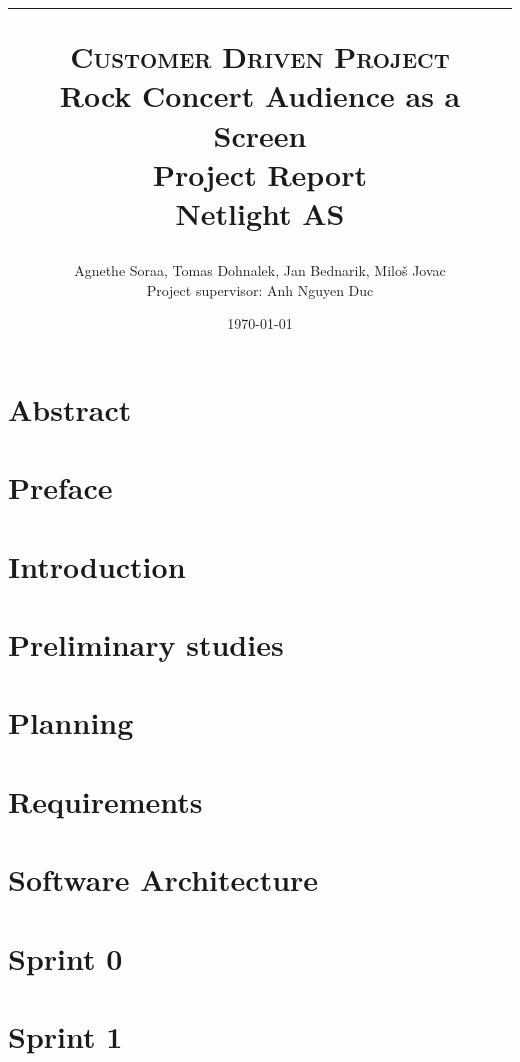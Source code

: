 \documentclass{report}
\title{
	\hrule
    \normalsize \textsc{Customer Driven Project}\\
    \Huge Rock Concert Audience as a Screen\\[10pt]
    \normalsize Project Report\\[10pt]
    Netlight AS
    \horrule{2pt}
    }
\author{Agnethe Soraa,
Tomas Dohnalek,
Jan Bednarik,
Miloš Jovac \\
\normalsize Project supervisor: Anh Nguyen Duc}
\date{\today}
\begin{document}
\maketitle
\chapter*{Abstract}


\chapter*{Preface}


\tableofcontents
\setcounter{page}{3}

\chapter{Introduction}


\chapter{Preliminary studies}


\chapter{Planning}


\chapter{Requirements}


%

\chapter{Software Architecture}


\chapter{Sprint 0}


\chapter{Sprint 1}

\end{document}
